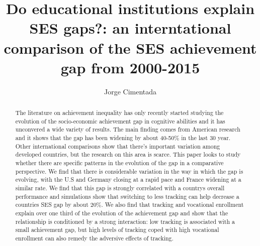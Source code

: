 \documentclass[11pt, a4paper]{article}\usepackage[]{graphicx}\usepackage[]{color}
\title{Do educational institutions explain SES gaps?: an interntational comparison of the SES achievement gap from 2000-2015}
\author{Jorge Cimentada}
\begin{document}
\setlength{\parindent}{2em}
\setlength{\parskip}{1em}

\maketitle





\begin{abstract}
The literature on achievement inequality has only recently started studying the evolution of the socio-economic achievement gap in cognitive abilities and it has unconvered a wide variety of results. The main finding comes from American research and it shows that the gap has been widening by about 40-50\% in the last 30 year. Other international comparisons show that there's important variation among developed countries, but the research on this area is scarce. This paper looks to study whether there are specific patterns in the evolution of the gap in a comparative perspective. We find that there is considerable variation in the way in which the gap is evolving, with the U.S and Germany closing at a rapid pace and France widening at a similar rate. We find that this gap is strongly correlated with a countrys overall performance and simulations show that switching to less tracking can help decrease a countries SES gap by about 20\%. We also find that tracking and vocational enrollment explain over one third of the evolution of the achievement gap and show that the relationship is conditioned by a strong interaction: low tracking is associated with a small achievement gap, but high levels of tracking coped with high vocational enrollment can also remedy the adversive effects of tracking.
\end{abstract}










\end{document}
